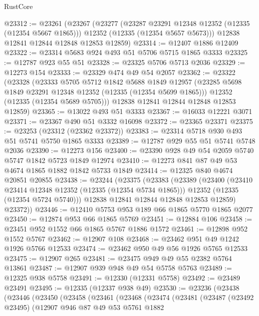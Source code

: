 \begin{lexlean}{RustCore}
\begin{coremodule}
@23312 := @23261
    (@23267
      (@23277
        (@23287 @23291 @12348 @12352 (@12335 (@12354 @5667 @1865)))
        @12352
        (@12335 (@12354 @5657 @5673)))
      @12838
      @12841
      @12844
      @12848
      @12853
      @12859)
@23314 := @12407 @1886 @12409
@23322 := @23314 @5683 @924 @493 @51 @5706 @5715 @1865 @3333
@23325 := @12787 @923 @55 @51
@23328 := @23325 @5706 @5713 @2036
@23329 := @12273 @154
@23333 := @23329 @474 @49 @54 @2057
@23362 := @23322
    (@23328
      (@23333
        @5705
        @5712
        @1842
        @5688
        @1849
        @12957
        (@23285 @5698 @1849 @23291 @12348 @12352 (@12335 (@12354 @5699 @1865)))
        @12352
        (@12335 (@12354 @5689 @5705)))
      @12838
      @12841
      @12844
      @12848
      @12853
      @12859)
@23365 := @13022 @493 @51 @3333
@23367 := @16033 @12221 @3071
@23371 := @23367 @490 @51 @3332 @16098
@23372 := @23365 @23371
@23375 := @23253 (@23312 (@23362 @23372))
@23383 := @23314 @5718 @930 @493 @51 @5741 @5750 @1865 @3333
@23389 := @12787 @929 @55 @51 @5741 @5748 @2036
@23390 := @12273 @156
@23400 := @23390 @928 @49 @54 @2059 @5740 @5747 @1842 @5723 @1849 @12974
@23410 := @12273 @841 @87 @49 @53 @4674 @1865 @1882 @1842 @5733 @1849
@23414 := @12325 @840 @4674 @20851 @20855
@23438 := @23244
    (@23375
      (@23383
        (@23389
          (@23400
            (@23410 @23414 @12348 @12352 (@12335 (@12354 @5734 @1865)))
            @12352
            (@12335 (@12354 @5724 @5740)))
          @12838
          @12841
          @12844
          @12848
          @12853
          @12859)
        @23372))
@23446 := @12410 @5753 @953 @189 @66 @1865 @5770 @1865 @2077
@23450 := @12874 @953 @66 @1865 @5769
@23451 := @12884 @106
@23458 := @23451 @952 @1552 @66 @1865 @5767 @1886 @1572
@23461 := @12898 @952 @1552 @5767
@23462 := @12907 @108
@23468 := @23462 @951 @49 @1242 @1926 @5766 @12533
@23474 := @23462 @950 @49 @56 @1926 @5765 @12533
@23475 := @12907 @265
@23481 := @23475 @949 @49 @55 @2382 @5764 @13861
@23487 := @12907 @939 @948 @49 @54 @5758 @5763
@23489 := @12325 @938 @5758
@23491 := @12330 (@12331 @5758)
@23492 := @23489 @23491
@23495 := @12335 (@12337 @938 @49)
@23530 := @23236
    (@23438
      (@23446
        (@23450
          (@23458
            (@23461
              (@23468
                (@23474
                  (@23481
                    (@23487
                      (@23492 @23495)
                      (@12907
                        @946
                        @87
                        @49
                        @53
                        @5761
                        @1882

\end{coremodule}
\end{lexlean}

